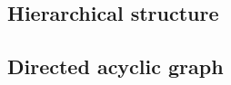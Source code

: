 \documentclass[11pt]{article}
\begin{document}
\subsection{Hierarchical structure}
\label{sec:hierarchy}
%
%
%
%
%
%

\subsection{Directed acyclic graph}
\label{sec:dag}
%
%
%
\end{document}
